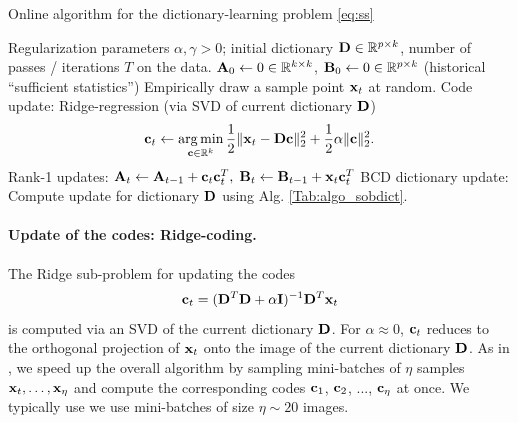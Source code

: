 \begin{algorithm}
\caption{Online algorithm for the dictionary-learning problem
  \eqref{eq:ss}}
\label{Tab:algo}
\begin{algorithmic}[1]
\Require %
Regularization parameters $\alpha, \gamma > 0$;
initial dictionary $\mathbf{D} \in \mathbb R^{p \times k}$,
number of passes / iterations $T$ on the data.
\State $\mathbf{A}_0 \leftarrow 0 \in \mathbb R^{k \times k}$, $\mathbf{B}_0
\leftarrow 0 \in \mathbb R^{p \times k}$ \text (historical ``sufficient statistics'')
\State Empirically draw a sample point $\mathbf{x}_t$ at random.
\State Code update: Ridge-regression (via SVD of current dictionary $\mathbf{D}$)
\begin{equation}
\mathbf{c}_t \leftarrow \operatorname*{arg\,min}_{\mathbf{c} \in \mathbb R^k}\frac{1}{2}\|\mathbf{x}_t -
\mathbf{D} \mathbf{c}\|_2^2 + \frac{1}{2}\alpha\|\mathbf{c}\|_2^2.
\label{eq:coding}
\end{equation}
\State Rank-1 updates:
$\mathbf{A}_t \leftarrow \mathbf{A}_{t-1} + \mathbf{c}_t\mathbf{c}_t^T,\; \mathbf{B}_t \leftarrow \mathbf{B}_{t-1} + \mathbf{x}_t\mathbf{c}_t^T$
\State BCD dictionary update: Compute update for dictionary $\mathbf{D}$ using
Alg. \ref{Tab:algo_sobdict}.
\EndFor
\end{algorithmic}
\end{algorithm}

\paragraph*{Update of the codes: Ridge-coding.}
The Ridge sub-problem for updating the codes%
\begin{equation}
  \mathbf{c}_t = (\mathbf{D}^T\mathbf{D} + \alpha \mathbf{I})^{-1}\mathbf{D}^T\mathbf{x}_t
  \label{eq:code}
\end{equation}
is computed via an SVD of the current dictionary $\mathbf{D}$.
For $\alpha \approx 0$, $\mathbf{c}_t$
reduces to the orthogonal projection of $\mathbf{x}_t$ onto the image of the current
dictionary $\mathbf{D}$.
As in   \citep{mairal2010}, we speed up the overall algorithm by sampling mini-batches of $\eta$ samples $\mathbf{x}_t,\ldots,\mathbf{x}_\eta$ and compute the corresponding codes $\mathbf{c}_1$, $\mathbf{c}_2$, ..., $\mathbf{c}_\eta$ at once. We typically use we use mini-batches of size $\eta \sim 20$ images.

